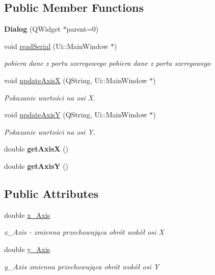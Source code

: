 \subsection*{Public Member Functions}
\begin{DoxyCompactItemize}
\item 
\mbox{\label{classDialog_acfa2063f9f962d394c6a645b6e7e08d8}} 
{\bfseries Dialog} (Q\+Widget $\ast$parent=0)
\item 
void \hyperlink{classDialog_a9dad20f00c0ea2dbf0b8a725a5fb8a55}{read\+Serial} (Ui\+::\+Main\+Window $\ast$)
\begin{DoxyCompactList}\small\item\em pobiera dane z portu szeregowego pobiera dane z portu szeregowego \end{DoxyCompactList}\item 
void \hyperlink{classDialog_a193d23a252d0fdae0fbf7bafe26b5436}{update\+AxisX} (Q\+String, Ui\+::\+Main\+Window $\ast$)
\begin{DoxyCompactList}\small\item\em Pokazanie wartości na osi X. \end{DoxyCompactList}\item 
void \hyperlink{classDialog_a80b79327f63cc80a253c3c728101fba8}{update\+AxisY} (Q\+String, Ui\+::\+Main\+Window $\ast$)
\begin{DoxyCompactList}\small\item\em Pokazanie wartości na osi Y. \end{DoxyCompactList}\item 
\mbox{\label{classDialog_aaa1f9474d6bb0ba9f96a8ea2ca5f64b3}} 
double {\bfseries get\+AxisX} ()
\item 
\mbox{\label{classDialog_a3fd1de19ccf0164ed8932c413b9fd7aa}} 
double {\bfseries get\+AxisY} ()
\end{DoxyCompactItemize}
\subsection*{Public Attributes}
\begin{DoxyCompactItemize}
\item 
\mbox{\label{classDialog_aa0b8b6a5f69da0c051262423f2754401}} 
double \hyperlink{classDialog_aa0b8b6a5f69da0c051262423f2754401}{x\+\_\+\+Axis}
\begin{DoxyCompactList}\small\item\em x\+\_\+\+Axis -\/ zmienna przechowująca obrót wokół osi X \end{DoxyCompactList}\item 
\mbox{\label{classDialog_a344f5d1343d5a34aaea52545c7c5220c}} 
double \hyperlink{classDialog_a344f5d1343d5a34aaea52545c7c5220c}{y\+\_\+\+Axis}
\begin{DoxyCompactList}\small\item\em y\+\_\+\+Axis zmienna przechowująca obrót wokół osi Y \end{DoxyCompactList}\end{DoxyCompactItemize}
